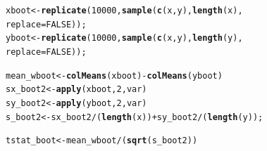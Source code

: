 \documentclass{beamer}\usepackage[]{graphicx}\usepackage[]{color}
\makeatletter
\newcommand{\hlnum}[1]{\textcolor[rgb]{0.2,0.2,0.2}{#1}}%
\newcommand{\hlopt}[1]{\textcolor[rgb]{0.102,0.102,0.102}{#1}}%
\newcommand{\hlstd}[1]{\textcolor[rgb]{0.102,0.102,0.102}{#1}}%
\newcommand{\hlkwb}[1]{\textcolor[rgb]{0.102,0.102,0.102}{#1}}%
\newcommand{\hlkwc}[1]{\textcolor[rgb]{0.2,0.2,0.2}{#1}}%
\newcommand{\hlkwd}[1]{\textcolor[rgb]{0.102,0.102,0.102}{\textbf{#1}}}%
\newenvironment{kframe}{%
 \def\at@end@of@kframe{}%
 \ifinner\ifhmode%
  \def\at@end@of@kframe{\end{minipage}}%
  \begin{minipage}{\columnwidth}%
 \fi\fi%
 \def\FrameCommand##1{\hskip\@totalleftmargin \hskip-\fboxsep
 \colorbox{shadecolor}{##1}\hskip-\fboxsep
     \hskip-\linewidth \hskip-\@totalleftmargin \hskip\columnwidth}%
 \MakeFramed {\advance\hsize-\width
   \@totalleftmargin\z@ \linewidth\hsize
   \@setminipage}}%
 {\par\unskip\endMakeFramed%
 \at@end@of@kframe}
\newenvironment{knitrout}{}{} %
\renewenvironment{knitrout}{\begin{spacing}{0.75}\begin{tiny}}{\end{tiny}\end{spacing}}
\makeatother
\begin{document}
\begin{frame}[fragile]

\begin{knitrout}\small
{}\color{fgcolor}\begin{kframe}
\begin{alltt}
\hlstd{xboot} \hlkwb{<-} \hlkwd{replicate}\hlstd{(}\hlnum{10000}\hlstd{,} \hlkwd{sample}\hlstd{(}\hlkwd{c}\hlstd{(x,y),} \hlkwd{length}\hlstd{(x),}
                                 \hlkwc{replace} \hlstd{=} \hlnum{FALSE}\hlstd{));}
\hlstd{yboot} \hlkwb{<-} \hlkwd{replicate}\hlstd{(}\hlnum{10000}\hlstd{,} \hlkwd{sample}\hlstd{(}\hlkwd{c}\hlstd{(x,y),} \hlkwd{length}\hlstd{(y),}
                                 \hlkwc{replace} \hlstd{=} \hlnum{FALSE}\hlstd{));}

\hlstd{mean_wboot} \hlkwb{<-} \hlkwd{colMeans}\hlstd{(xboot)}  \hlopt{-} \hlkwd{colMeans}\hlstd{(yboot)}
\hlstd{sx_boot2} \hlkwb{<-} \hlkwd{apply}\hlstd{(xboot,} \hlnum{2}\hlstd{, var)}
\hlstd{sy_boot2} \hlkwb{<-} \hlkwd{apply}\hlstd{(yboot,} \hlnum{2}\hlstd{, var)}
\hlstd{s_boot2} \hlkwb{<-} \hlstd{sx_boot2}\hlopt{/}\hlstd{(}\hlkwd{length}\hlstd{(x))} \hlopt{+} \hlstd{sy_boot2}\hlopt{/}\hlstd{(}\hlkwd{length}\hlstd{(y));}

\hlstd{tstat_boot} \hlkwb{<-} \hlstd{mean_wboot}\hlopt{/}\hlstd{(}\hlkwd{sqrt}\hlstd{(s_boot2))}
\end{alltt}
\end{kframe}
\end{knitrout}

\end{frame}
\end{document}
